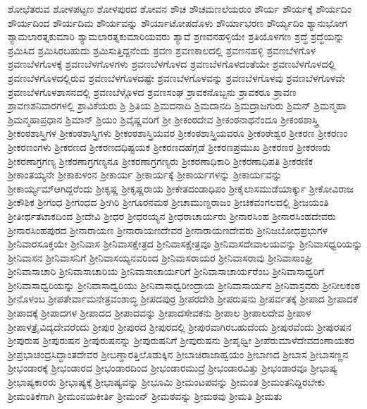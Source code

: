 {ಶೋಭೆತರುವ
ಶೋಳಪಟ್ಟಣ
ಶೋಳಪುರದ
ಶೋವನ
ಶೌಚ
ಶೌಚಮಣಲೆಯರುಂ
ಶೌರ್ಯ
ಶೌರ್ಯಕ್ಕೆ
ಶೌರ್ಯದಿಂ
ಶೌರ್ಯದಿಂದ
ಶೌರ್ಯದಿಮ
ಶೌರ್ಯವನ್ನು
ಶೌರ್ಯಾಟೋಪದೊಳು
ಶೌರ್ಯಾಭರಣ
ಶೌರ್ಯ್ಯದಿಂ
ಶ್ಯಾನುಭೋಗ
ಶ್ಯಾಮಲಾರತ್ನಕುಮಾರಿ
ಶ್ಯಾಮಲಾರತ್ನಕುಮಾರಿಯವರು
ಶ್ಯಾವೆ
ಶ್ರಣವನಹಳ್ಳಿಯೇ
ಶ್ರತಿಯೊಳಗಣ
ಶ್ರದ್ಧೆ
ಶ್ರದ್ಧೆಯನ್ನು
ಶ್ರಮಿಸಿದ
ಶ್ರಮಿಸಿರಬಹುದು
ಶ್ರಮಿಸುತ್ತಿದ್ದನೆಂದು
ಶ್ರವಣ
ಶ್ರವಣಕಾಲದಲ್ಲಿ
ಶ್ರವಣನಹಳ್ಳಿ
ಶ್ರವಣಬೆಳಗೊಳ
ಶ್ರವಣಬೆಳಗೊಳಕ್ಕೆ
ಶ್ರವಣಬೆಳಗೊಳಗಳು
ಶ್ರವಣಬೆಳಗೊಳದ
ಶ್ರವಣಬೆಳಗೊಳದಂತೆಯೇ
ಶ್ರವಣಬೆಳಗೊಳದಲ್ಲಿ
ಶ್ರವಣಬೆಳಗೊಳದಲ್ಲಿರುವ
ಶ್ರವಣಬೆಳಗೊಳದಷ್ಟೇ
ಶ್ರವಣಬೆಳಗೊಳವನ್ನು
ಶ್ರವಣಬೆಳಗೊಳವು
ಶ್ರವಣಬೆಳಗೊಳವೇ
ಶ್ರವಣಬೆಳಗೊಳಶಾಸನದಲ್ಲಿ
ಶ್ರವಣಬೆಳ್ಗೊಳದ
ಶ್ರವಣಸಂಘ
ಶ್ರಾವಕನೊಬ್ಬನು
ಶ್ರಾವಕರೂ
ಶ್ರಾವಣ
ಶ್ರಾವಣಶನಿವಾರಗಳಲ್ಲಿ
ಶ್ರಾವಿಕೆಯರು
ಶ್ರಿ
ಶ್ರಿತಿಯ
ಶ್ರಿಮದನಾದಿ
ಶ್ರಿಮದಾನದಿ
ಶ್ರಿಮದ್ರಾಜಗುರು
ಶ್ರಿಮನ್
ಶ್ರಿಮನ್ಮಹಾ
ಶ್ರಿಮನ್ಮಹಾಪ್ರಧಾನ
ಶ್ರಿಮಾನ್
ಶ್ರಿಯಂ
ಶ್ರಿವೈಷ್ಣವರಿಗೆ
ಶ್ರೀ
ಶ್ರೀಕಂಠದೇವ
ಶ್ರೀಕಂಠನಾಥನೆಂದೂ
ಶ್ರೀಕಂಠಶಾಸ್ತ್ರಿ
ಶ್ರೀಕಂಠಶಾಸ್ತ್ರಿಗಳ
ಶ್ರೀಕಂಠಶಾಸ್ತ್ರಿಗಳು
ಶ್ರೀಕಂಠಶಾಸ್ತ್ರಿಯವರ
ಶ್ರೀಕಂಠಶಾಸ್ತ್ರಿಯವರೂ
ಶ್ರೀಕಂಠೇಶ್ವರ
ಶ್ರೀಕರಣ
ಶ್ರೀಕರಣಂ
ಶ್ರೀಕರಣಂಗಳು
ಶ್ರೀಕರಣದ
ಶ್ರೀಕರಣದಧಿಷ್ಟಯಕ
ಶ್ರೀಕರಣದಹೆಗ್ಗಡೆ
ಶ್ರೀಕರಣಪ್ರಮುಖ
ಶ್ರೀಕರಣರ
ಶ್ರೀಕರಣರು
ಶ್ರೀಕರಣಾಗ್ರಗಣ್ಯ
ಶ್ರೀಕರಣಾಗ್ರಗಣ್ಯನೂ
ಶ್ರೀಕರಣಾಗ್ರಗಣ್ಯರು
ಶ್ರೀಕರಣಾಧಿಕಾರಿ
ಶ್ರೀಕರಣಾಧಿಪತಿ
ಶ್ರೀಕರಣಿಕ
ಶ್ರೀಕಾಂತಯ್ಯನೇ
ಶ್ರೀಕಾಕುಳಂನ
ಶ್ರೀಕಾರ್ಯ
ಶ್ರೀಕಾರ್ಯಕ್ಕೆ
ಶ್ರೀಕಾರ್ಯಗಳನ್ನು
ಶ್ರೀಕಾರ್ಯವನ್ನು
ಶ್ರೀಕಾರ್ಯ್ಯಮ್ಆಗಿದ್ದರೆಂದು
ಶ್ರೀಕೃಷ್ಣ
ಶ್ರೀಕೃಷ್ಣರಾಯ
ಶ್ರೀಕೇತದಂಡಾಧಿಪಂ
ಶ್ರೀಕೈಲಾಸಮುಡೆಯಾರ್ಕ್ಕು
ಶ್ರೀಕೋವಿರಾಜ
ಶ್ರೀಕೌಶಿಕ
ಶ್ರೀಗಂಧ
ಶ್ರೀಗಂಧದ
ಶ್ರೀಗಿರಿ
ಶ್ರೀಗೂರನಮಠ
ಶ್ರೀಚಾಮುಣ್ಡರಾಜಂ
ಶ್ರೀಚಿಕವಂಗಲದಲ್ಲಿ
ಶ್ರೀಜಯಂತಿ
ಶ್ರೀತೀರ್ಥತಟಾಕದಿಂದ
ಶ್ರೀದೇವಿ
ಶ್ರೀಧರ
ಶ್ರೀಧರಯ್ಯನ
ಶ್ರೀಧರಾಚಾರ್ಯರು
ಶ್ರೀನಾರಸಿಂಹ
ಶ್ರೀನಾರಸಿಂಹದೇವರು
ಶ್ರೀನಾರಸಿಂಹಪುರದ
ಶ್ರೀನಾರಾಯಣ
ಶ್ರೀನಾರಾಯಣದೇವರ
ಶ್ರೀನಾರಾಯಣದೇವರು
ಶ್ರೀನಿಜಬೋಧಪ್ರಭುಗಳ
ಶ್ರೀನಿವಾರಸೂಕ್ತಯೇ
ಶ್ರೀನಿವಾಸ
ಶ್ರೀನಿವಾಸಕ್ಷೇತ್ರದ
ಶ್ರೀನಿವಾಸಕ್ಷೇತ್ರವೂ
ಶ್ರೀನಿವಾಸದೇವಾಲಯವನ್ನು
ಶ್ರೀನಿವಾಸಧ್ವರಿಯನ್ನು
ಶ್ರೀನಿವಾಸನ
ಶ್ರೀನಿವಾಸನಿಗೆ
ಶ್ರೀನಿವಾಸಯ್ಯನವರಿಂದ
ಶ್ರೀನಿವಾಸರಾಯರ
ಶ್ರೀನಿವಾಸರಾವು
ಶ್ರೀನಿವಾಸಾಂಘ್ರಿ
ಶ್ರೀನಿವಾಸಾಚಾರಿ
ಶ್ರೀನಿವಾಸಾಚಾರಿಯ
ಶ್ರೀನಿವಾಸಾಚಾರ್ಯರಿಗೆ
ಶ್ರೀನಿವಾಸಾಚಾರ್ಯರೆಂಬ
ಶ್ರೀನಿವಾಸಾಧ್ವರಿಗೆ
ಶ್ರೀನಿವಾಸಾಧ್ವರಿಯನ್ನು
ಶ್ರೀನಿವಾಸಾಧ್ವರಿಯು
ಶ್ರೀನಿವಾಸಾಧ್ವರೀಂದ್ರಾಯ
ಶ್ರೀನಿವಾಸಾರ್ಯನ
ಶ್ರೀನಿವಾಸ್ರವರು
ಶ್ರೀನೀಲಕಂಠ
ಶ್ರೀನೊಳಂಬ
ಶ್ರೀಪತೇರ್ವಾಮನೇತ್ರವಂಶಾಬ್ಧಿ
ಶ್ರೀಪದಪುರ್ರ
ಶ್ರೀಪರದೇಶಿ
ಶ್ರೀಪರುಷನು
ಶ್ರೀಪರ್ವತಕ್ಕೆ
ಶ್ರೀಪಾದ
ಶ್ರೀಪಾದಕೆ
ಶ್ರೀಪಾದಕ್ಕೆ
ಶ್ರೀಪಾದಗಳ
ಶ್ರೀಪಾದದ
ಶ್ರೀಪಾದವನ್ನು
ಶ್ರೀಪಾದಸೇವಕನು
ಶ್ರೀಪಾಲ
ಶ್ರೀಪಾಲದೇವ
ಶ್ರೀಪಾಳ
ಶ್ರೀಪಾಳತ್ರೈವಿದ್ಯದೇವರೆಂದು
ಶ್ರೀಪುರ
ಶ್ರೀಪುರದ
ಶ್ರೀಪುರದಲ್ಲಿ
ಶ್ರೀಪುರವಾಗಿರಬಹುದೆಂದು
ಶ್ರೀಪುರವೆಂದು
ಶ್ರೀಪುರಷನ
ಶ್ರೀಪುರುಷ
ಶ್ರೀಪುರುಷನ
ಶ್ರೀಪುರುಷನನ್ನು
ಶ್ರೀಪುರುಷನಿಗೆ
ಶ್ರೀಪುರುಷನು
ಶ್ರೀಪೃಥ್ವೀ
ಶ್ರೀಪೆರುಮಾಳೆದೇವದಂಣಾಯಕರ
ಶ್ರೀಪ್ರಭಾಚಂದ್ರಸಿದ್ಧಾಂತದೇವರ
ಶ್ರೀಬಣ್ಡಾರತ್ತಿಲೊಡುಕ್ಕಿನ
ಶ್ರೀಬಾಚಿರಾಜಾಹ್ವಯಂ
ಶ್ರೀಬಾಣದ
ಶ್ರೀಬಾಸ
ಶ್ರೀಬಾಸಣ್ಣನ
ಶ್ರೀಭಂಡಾರಕ್ಕೆ
ಶ್ರೀಭಂಡಾರದ
ಶ್ರೀಭಂಡಾರದಿಂದ
ಶ್ರೀಭಂಡಾರಮುದ್ರೆ
ಶ್ರೀಭಂಡಾರವಿತ್ತು
ಶ್ರೀಭಂಡಾರವೂ
ಶ್ರೀಭಾಷ್ಯ
ಶ್ರೀಭಾಷ್ಯಕಾರರು
ಶ್ರೀಭಾಷ್ಯಕ್ಕೆ
ಶ್ರೀಭಾಷ್ಯವನ್ನು
ಶ್ರೀಭೂಮಿ
ಶ್ರೀಮಂಟಪವನ್ನು
ಶ್ರೀಮಂತ
ಶ್ರೀಮಂತನಿದ್ದಿರಬೇಕು
ಶ್ರೀಮಂತಿಕೆಗಾಗಿ
ಶ್ರೀಮಂನಯಕೀರ್ತಿ
ಶ್ರೀಮಂನ್
ಶ್ರೀಮಠವನ್ನು
ಶ್ರೀಮಠವು
ಶ್ರೀಮತಿ
ಶ್ರೀಮತು
}
